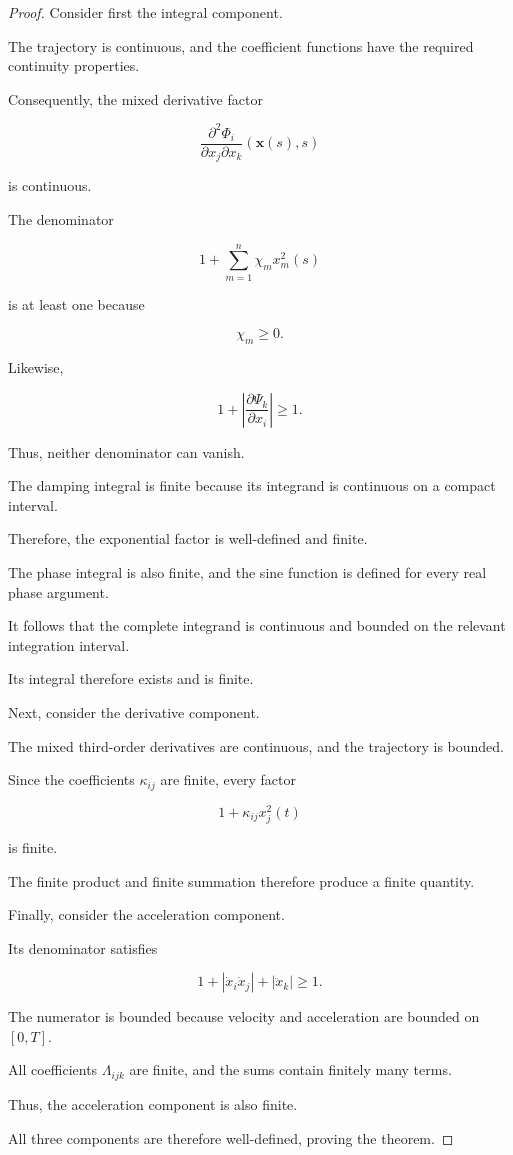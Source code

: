 \documentclass[12pt]{article}
\numberwithin{equation}{section}
\theoremstyle{definition}
\theoremstyle{remark}
\begin{document}
\begin{proof}

Consider first the integral component.

The trajectory is continuous, and the
coefficient functions have the required
continuity properties.

Consequently, the mixed derivative factor

\[
\frac{\partial^2\Phi_i}
{\partial x_j\partial x_k}
(\mathbf{x}(s),s)
\]

is continuous.

The denominator

\[
1+\sum_{m=1}^{n}\chi_mx_m^2(s)
\]

is at least one because

\[
\chi_m\geq0.
\]

Likewise,

\[
1+
\left|
\frac{\partial\Psi_k}{\partial x_i}
\right|
\geq1.
\]

Thus, neither denominator can vanish.

The damping integral is finite because
its integrand is continuous on a compact
interval.

Therefore, the exponential factor is
well-defined and finite.

The phase integral is also finite, and
the sine function is defined for every
real phase argument.

It follows that the complete integrand
is continuous and bounded on the relevant
integration interval.

Its integral therefore exists and is finite.

Next, consider the derivative component.

The mixed third-order derivatives are
continuous, and the trajectory is bounded.

Since the coefficients \(\kappa_{ij}\)
are finite, every factor

\[
1+\kappa_{ij}x_j^2(t)
\]

is finite.

The finite product and finite summation
therefore produce a finite quantity.

Finally, consider the acceleration component.

Its denominator satisfies

\[
1+
|\dot{x}_i\dot{x}_j|
+
|\ddot{x}_k|
\geq1.
\]

The numerator is bounded because velocity
and acceleration are bounded on \([0,T]\).

All coefficients \(\Lambda_{ijk}\) are
finite, and the sums contain finitely
many terms.

Thus, the acceleration component is also
finite.

All three components are therefore
well-defined, proving the theorem.

\end{proof}
\end{document}
